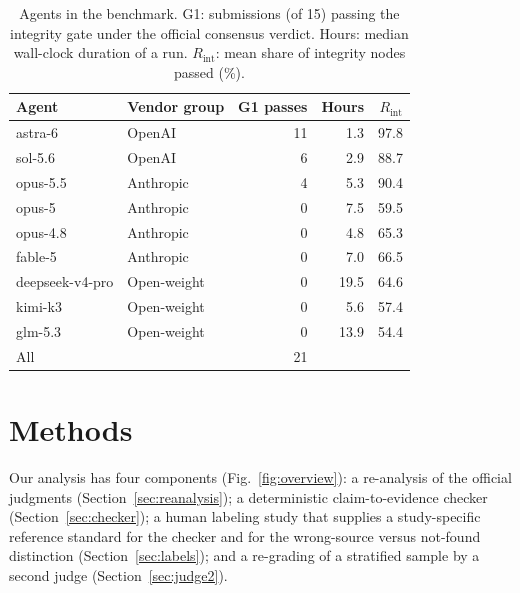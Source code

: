 \documentclass[preprint,12pt,authoryear]{elsarticle}
\begin{document}
\begin{table}[t]
\centering
\caption{Agents in the benchmark. G1: submissions (of 15) passing the integrity gate under the official consensus verdict. Hours: median wall-clock duration of a run. $R_\text{int}$: mean share of integrity nodes passed (\%).}
\label{tab:agents}
\footnotesize
\begin{tabular}{@{}llrrr@{}}
\toprule
Agent & Vendor group & G1 passes & Hours & $R_\text{int}$\\
\midrule
astra-6 & OpenAI & 11 & 1.3 & 97.8\\
sol-5.6 & OpenAI & 6 & 2.9 & 88.7\\
opus-5.5 & Anthropic & 4 & 5.3 & 90.4\\
opus-5 & Anthropic & 0 & 7.5 & 59.5\\
opus-4.8 & Anthropic & 0 & 4.8 & 65.3\\
fable-5 & Anthropic & 0 & 7.0 & 66.5\\
deepseek-v4-pro & Open-weight & 0 & 19.5 & 64.6\\
kimi-k3 & Open-weight & 0 & 5.6 & 57.4\\
glm-5.3 & Open-weight & 0 & 13.9 & 54.4\\
\midrule
All & & 21 & & \\
\bottomrule
\end{tabular}
\end{table}

\section{Methods}\label{sec:methods}

Our analysis has four components (Fig.~\ref{fig:overview}): a re-analysis of the official judgments (Section~\ref{sec:reanalysis}); a deterministic claim-to-evidence checker (Section~\ref{sec:checker}); a human labeling study that supplies a study-specific reference standard for the checker and for the wrong-source versus not-found distinction (Section~\ref{sec:labels}); and a re-grading of a stratified sample by a second judge (Section~\ref{sec:judge2}).
\end{document}
